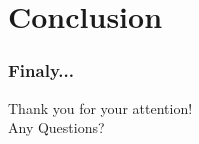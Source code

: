 \documentclass[11pt,aspectratio=169]{beamer}
\begin{document}

%

%

%
%

%
\section{Conclusion}




\begin{frame}\frametitle{Finaly...}
\centering

Thank you for your attention!\\
Any Questions?
\end{frame}



\end{document}
